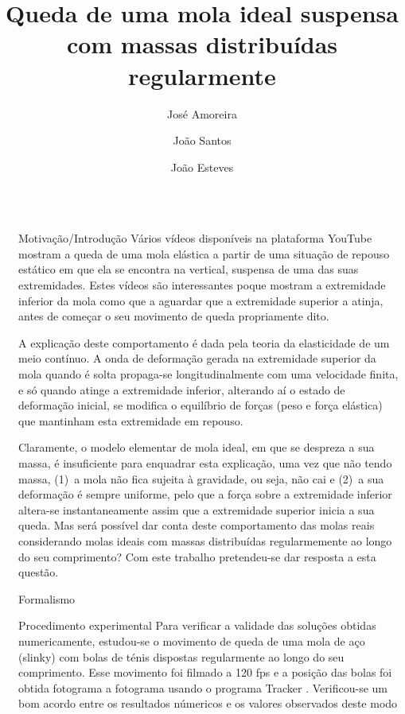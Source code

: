 \documentclass[final]{beamer}
\title{Queda de uma mola ideal suspensa com massas distribuídas regularmente}
\author{José Amoreira \inst{1,2,3} \and João Santos \inst{2} \and João Esteves \inst{2}}
\institute[]{\inst{1} Laboratório de Instrumentação e Física Experimental de Partículas \and  \inst{2}Universidade da Beira Interior  \samelineand \inst{3} Centro de Matemática e Aplicações}
\newlength{\sepwidth}
\newlength{\colwidth}
\newcommand{\separatorcolumn}{\begin{column}{\sepwidth}\end{column}}
\begin{document}
\begin{frame}[t]
\begin{columns}[t]
\separatorcolumn
\begin{column}{\colwidth}
\begin{exampleblock}{Motivação/Introdução}
 Vários vídeos disponíveis na plataforma YouTube mostram a queda de uma mola
  elástica a partir de uma situação de repouso estático em que ela se encontra
  na vertical, suspensa de uma das suas extremidades. Estes vídeos são
  interessantes poque mostram a extremidade inferior da mola como que a aguardar
  que a extremidade superior a atinja, antes de começar o seu movimento de queda
  propriamente dito. 
	
  A explicação deste comportamento é dada pela teoria da elasticidade de um meio
  contínuo. A onda de deformação gerada na extremidade superior da mola quando é
  solta propaga-se longitudinalmente com uma velocidade finita, e só quando
  atinge a extremidade inferior, alterando aí o estado de deformação inicial, se
  modifica o equilíbrio de forças (peso e força elástica) que mantinham esta
  extremidade em repouso.
	
  Claramente, o modelo elementar de mola ideal, em que se despreza a sua massa,
  é insuficiente para enquadrar esta explicação, uma vez que não tendo massa,
  (1)~a mola não fica sujeita à gravidade, ou seja, não cai e (2)~a sua
  deformação é sempre uniforme, pelo que a força sobre a extremidade inferior
  altera-se instantaneamente assim que a extremidade superior inicia a sua
  queda. Mas será possível dar conta deste comportamento das molas reais
  considerando molas ideais com massas distribuídas regularmemente ao longo do
  seu comprimento? Com este trabalho pretendeu-se dar resposta a esta questão.
\end{exampleblock}
\begin{block}{Formalismo}
	\vspace{1cm}
	
\end{block}
\begin{block}{Procedimento experimental}
	Para verificar a validade das soluções obtidas numericamente, estudou-se o movimento de queda de uma mola de aço (slinky) com bolas de ténis dispostas regularmente ao longo do seu comprimento. Esse movimento foi filmado a 120 fps e a posição das bolas foi obtida fotograma a fotograma usando o programa Tracker \cite{Tracker}. Verificou-se um bom acordo entre os resultados númericos e os valores observados deste modo 


\end{block}
\end{column}
\end{columns}
\end{frame}
\end{document}
